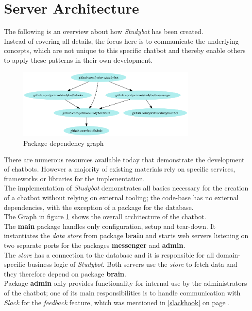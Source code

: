 \section{Server Architecture}


The following is an overview about how \emph{Studybot} has been created.
\\
Instead of covering all details, the focus here is to communicate the underlying concepts,
which are not unique to this specific chatbot and thereby enable others to apply these patterns in their own development.
\\

\begin{figure}[h]
  \centering
  \includegraphics[width=0.8\textwidth]{images/internal-deps.png}
  \caption{Package dependency graph\protect\footnotemark}
	\label{fig:internal-deps}
\end{figure}

There are numerous resources available today that demonstrate the development of chatbots.
However a majority of existing materials rely on specific services, frameworks or libraries for the implementation.
\\
The implementation of \emph{Studybot} demonstrates all basics necessary for the creation of a chatbot
without relying on external tooling;
the code-base has no external dependencies, with the exception of a package for the database.
\\

The Graph in figure \ref{fig:internal-deps} shows the overall architecture of the chatbot.
\\
The \textbf{main} package handles only configuration, setup and tear-down.
It instantiates the \emph{data store} from package \textbf{brain}
and starts web servers listening on two separate ports for the packages \textbf{messenger} and \textbf{admin}.
\\

The \emph{store} has a connection to the database and it is responsible for all domain-specific business logic of \emph{Studybot}.
Both servers use the \emph{store} to fetch data and they therefore depend on package \textbf{brain}.
\\
Package \textbf{admin} only provides functionality for internal use by the administrators of the chatbot;
one of its main responsibilities is to handle communication with \emph{Slack}
for the \emph{feedback} feature, which was mentioned in \ref{slackhook} on page \pageref{slackhook}.
\\

